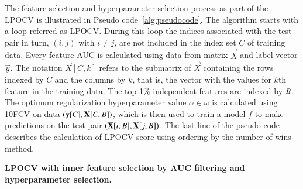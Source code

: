 The feature selection and hyperparameter selection process as part of the LPOCV
is illustrated in Pseudo code~\ref{alg:pseudocode}. The algorithm starts with a
loop referred as LPOCV\@. During this loop the indices associated with the test
pair in turn, $(i,j)$ with $i \neq j$, are not included in the index set $C$ of
training data. Every feature AUC is calculated using data from matrix $\vec{X}$
and label vector $\vec{y}$. The notation $\vec{X}[C,k]$ refers to the submatrix
of $\vec{X}$ containing the rows indexed by $C$ and the columns by $k$, that is,
the vector with the values for $k$th feature in the training data. The top 1\%
independent features are indexed by $B$. The optimum regularization
hyperparameter value $\alpha \in \omega$ is calculated using 10FCV on data
$(\mathbf{y}[C], \mathbf{X}[C,B])$, which is then used to train a model $f$ to
make predictions on the test pair $(\mathbf{X}[i,B], \mathbf{X}[j,B])$. The
last line of the pseudo code describes the calculation of LPOCV score using
ordering-by-the-number-of-wins method.

\begin{algorithm}[!h]
  \caption{{\bf LPOCV with inner feature selection by AUC filtering and
  hyperparameter selection.}}%
  \label{alg:pseudocode}

  \begin{algorithmic}
      \ENDFOR{}
    \ENDFOR{}
  \end{algorithmic}
\end{algorithm}


